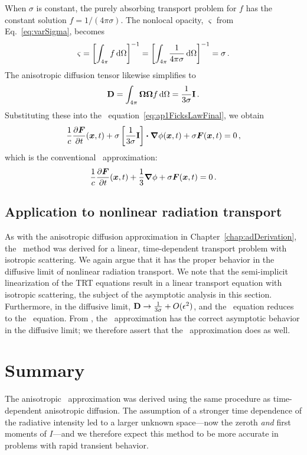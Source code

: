 When $\sigma$ is constant, the purely absorbing transport problem for $f$ has the
constant solution $f=1/(4\pi\sigma)$. The nonlocal opacity, $\varsigma$ from
Eq.~\eqref{eq:varSigma}, becomes
\begin{equation*}
  \varsigma
  = \left[ \int_{4\pi} f \mathop{}\!\mathrm{d} \Omega \right]^{-1}
  = \left[ \int_{4\pi} \frac{1}{4\pi\sigma} \mathop{}\!\mathrm{d} \Omega \right]^{-1}
  = \sigma \,.
\end{equation*}
The anisotropic diffusion tensor likewise simplifies to
\begin{equation*}
  \mathbf{D} = \int_{4\pi} \bm{\Omega}\bm{\Omega} f \mathop{}\!\mathrm{d} \Omega =
  \frac{1}{3\sigma}\mathbf{I} \,.
\end{equation*}
Substituting these into the \APone\ equation~\eqref{eq:ap1FicksLawFinal}, we obtain
\begin{equation*}
  \frac{1}{c}\frac{\partial \bm{F}}{\partial t}(\bm{x},t)
  + \sigma \left[ \frac{1}{3\sigma}\mathbf{I} \right] \bm{\cdot} \bm{\nabla} \phi(\bm{x}, t)
  + \sigma\bm{F}(\bm{x},t) 
  = 0 \,,
\end{equation*}
which is the conventional \Pone\ approximation:
\begin{equation*}
  \frac{1}{c}\frac{\partial \bm{F}}{\partial t}(\bm{x},t) + \frac{1}{3} \bm{\nabla} \phi
  + \sigma\bm{F}(\bm{x},t) 
  = 0\,.
\end{equation*}

\subsection{Application to nonlinear radiation transport}

As with the anisotropic diffusion approximation in
Chapter~\ref{chap:adDerivation}, the \APone\ method was derived for a linear,
time-dependent transport problem with isotropic scattering. We again argue that
it has the proper behavior in the diffusive limit of nonlinear radiation
transport. We note that the semi-implicit linearization of the TRT
equations result in a linear transport equation with isotropic scattering, the
subject of the asymptotic analysis in this section.
Furthermore, in the diffusive limit, $\mathbf{D} \to \frac{1}{3\sigma} +
O(\epsilon^2)$, and the \APone\ equation reduces to the \Pone\ equation. From
\cite{Mor2000}, the \Pone\ approximation has the correct asymptotic behavior in
the diffusive limit; we therefore assert that the \APone\ approximation does
as well. 


\section{Summary}
The anisotropic \Pone\ approximation was derived using the same procedure as 
time-dependent anisotropic diffusion. The assumption of a stronger time
dependence of the radiative intensity led to a larger unknown space---now the
zeroth \emph{and} first moments of $I$---and we therefore expect this method to
be more accurate in problems with rapid transient behavior.


